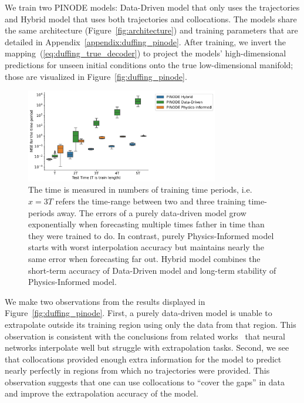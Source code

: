 We train two PINODE models: Data-Driven model that only uses the trajectories and Hybrid model that uses both trajectories and collocations. The models share the same architecture (Figure~\ref{fig:architecture}) and training parameters that are detailed in Appendix~\ref{appendix:duffing_pinode}. After training, we invert the mapping~(\ref{eq:duffing_true_decoder}) to project the models' high-dimensional predictions for unseen initial conditions onto the true low-dimensional manifold; those are visualized in  Figure~\ref{fig:duffing_pinode}.  

\begin{figure}[t]
    \centering
    \includegraphics[width=0.75\textwidth]{figures/duffing_periods.pdf}
    \caption{ The time is measured in numbers of training time periods, i.e. $x=3T$ refers the time-range between two and three training time-periods away. The errors of a purely data-driven model grow exponentially when forecasting multiple times father in time than they were trained to do. In contrast, purely Physics-Informed model starts with worst interpolation accuracy but maintains nearly the same error when forecasting far out. Hybrid model combines the short-term accuracy of Data-Driven model and long-term stability of Physics-Informed model.}%
    \label{fig:duffing_periods}
\end{figure}




We make two observations from the results displayed in Figure~\ref{fig:duffing_pinode}. First, a purely data-driven model is unable to extrapolate outside its training region using only the data from that region. This observation is consistent with the conclusions from related works~\cite{gin2021deep} that neural networks interpolate well but struggle with extrapolation tasks. Second, we see that collocations provided enough extra information for the model to predict nearly perfectly in regions from which no trajectories were provided. This observation suggests that one can use collocations to ``cover the gaps'' in data and improve the extrapolation accuracy of the model. 

